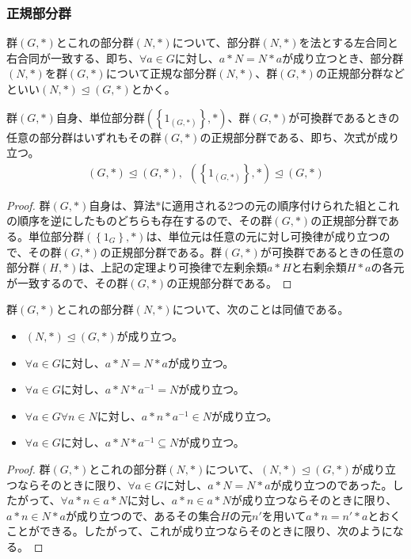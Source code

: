 \documentclass[dvipdfmx]{jsarticle}
\begin{document}
\begin{dfn}
\subsubsection{正規部分群}%
\begin{dfn}
群$(G,*)$とこれの部分群$(N,*)$について、部分群$(N,*)$を法とする左合同と右合同が一致する、即ち、$\forall a \in G$に対し、$a*N = N*a$が成り立つとき、部分群$(N,*)$を群$(G,*)$について正規な部分群$(N,*)$、群$(G,*)$の正規部分群などといい$(N,*) \trianglelefteq (G,*)$とかく。
\end{dfn}
\begin{thm}\label{3.1.1.24}
群$(G,*)$自身、単位部分群$\left( \left\{ 1_{(G,*)} \right\},* \right)$、群$(G,*)$が可換群であるときの任意の部分群はいずれもその群$(G,*)$の正規部分群である、即ち、次式が成り立つ。
\begin{align*}
(G,*) \trianglelefteq (G,*),\ \ \left( \left\{ 1_{(G,*)} \right\},* \right) \trianglelefteq (G,*)
\end{align*}
\end{thm}
\begin{proof}
群$(G,*)$自身は、算法$*$に適用される2つの元の順序付けられた組とこれの順序を逆にしたものどちらも存在するので、その群$(G,*)$の正規部分群である。単位部分群$\left( \left\{ 1_{G} \right\},* \right)$は、単位元は任意の元に対し可換律が成り立つので、その群$(G,*)$の正規部分群である。群$(G,*)$が可換群であるときの任意の部分群$(H,*)$は、上記の定理より可換律で左剰余類$a*H$と右剰余類$H*a$の各元が一致するので、その群$(G,*)$の正規部分群である。
\end{proof}
\begin{thm}\label{3.1.1.25}
群$(G,*)$とこれの部分群$(N,*)$について、次のことは同値である。
\begin{itemize}
\item
  $(N,*) \trianglelefteq (G,*)$が成り立つ。
\item
  $\forall a \in G$に対し、$a*N = N*a$が成り立つ。
\item
  $\forall a \in G$に対し、$a*N*a^{- 1} = N$が成り立つ。
\item
  $\forall a \in G\forall n \in N$に対し、$a*n*a^{- 1} \in N$が成り立つ。
\item
  $\forall a \in G$に対し、$a*N*a^{- 1} \subseteq N$が成り立つ。
\end{itemize}
\end{thm}
\begin{proof}
群$(G,*)$とこれの部分群$(N,*)$について、$(N,*) \trianglelefteq (G,*)$が成り立つならそのときに限り、$\forall a \in G$に対し、$a*N = N*a$が成り立つのであった。したがって、$\forall a*n \in a*N$に対し、$a*n \in a*N$が成り立つならそのときに限り、$a*n \in N*a$が成り立つので、あるその集合$H$の元$n'$を用いて$a*n = n'*a$とおくことができる。したがって、これが成り立つならそのときに限り、次のようになる。

\end{proof}
\end{dfn}
\end{document}
